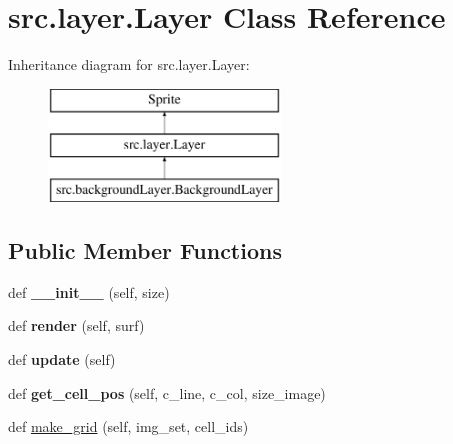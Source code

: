 \hypertarget{classsrc_1_1layer_1_1_layer}{}\section{src.\+layer.\+Layer Class Reference}
\label{classsrc_1_1layer_1_1_layer}
Inheritance diagram for src.\+layer.\+Layer\+:\begin{figure}[H]
\begin{center}
\leavevmode
\includegraphics[height=3.000000cm]{classsrc_1_1layer_1_1_layer}
\end{center}
\end{figure}
\subsection*{Public Member Functions}
\begin{DoxyCompactItemize}
\item 
\hypertarget{classsrc_1_1layer_1_1_layer_afb0f95173b44d2cd9942a3bec2b84eeb}{}\label{classsrc_1_1layer_1_1_layer_afb0f95173b44d2cd9942a3bec2b84eeb} 
def {\bfseries \+\_\+\+\_\+init\+\_\+\+\_\+} (self, size)
\item 
\hypertarget{classsrc_1_1layer_1_1_layer_a78a4e2da87ec9a61fe566359ace3d67b}{}\label{classsrc_1_1layer_1_1_layer_a78a4e2da87ec9a61fe566359ace3d67b} 
def {\bfseries render} (self, surf)
\item 
\hypertarget{classsrc_1_1layer_1_1_layer_a6f780023058a52954127d05226d167f7}{}\label{classsrc_1_1layer_1_1_layer_a6f780023058a52954127d05226d167f7} 
def {\bfseries update} (self)
\item 
\hypertarget{classsrc_1_1layer_1_1_layer_acb009d1cb2cbb276f3e1d880dc766190}{}\label{classsrc_1_1layer_1_1_layer_acb009d1cb2cbb276f3e1d880dc766190} 
def {\bfseries get\+\_\+cell\+\_\+pos} (self, c\+\_\+line, c\+\_\+col, size\+\_\+image)
\item 
def \hyperlink{classsrc_1_1layer_1_1_layer_a6d99c2cef696b679bbc26f4307b21427}{make\+\_\+grid} (self, img\+\_\+set, cell\+\_\+ids)
\end{DoxyCompactItemize}
